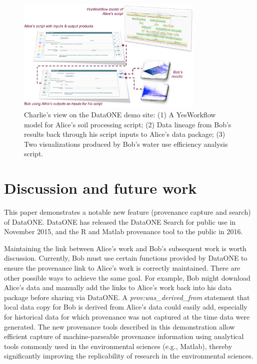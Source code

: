 \documentclass[a4paper]{llncs}
\begin{document}
\begin{figure}[t]
\centering   
\includegraphics[width=0.8\textwidth]{figs/abc-crop}
\caption{Charlie's view on the DataONE demo site: (1) A YesWorkflow model for Alice's soil processing script; (2) Data lineage from Bob's results back through his script inputs to Alice's data package; (3) Two visualizations produced by Bob's water use efficiency analysis script.}
\label{fig2}
\end{figure}


\section{Discussion and future work}

This paper demonstrates a notable new feature (provenance capture and search) of DataONE. DataONE has released the DataONE Search for public use in November 2015, and the R and Matlab provenance tool to the public in 2016. 

Maintaining the link between Alice's work and Bob's subsequent work is worth discussion. Currently, Bob must use certain functions provided by DataONE to ensure the provenance link to Alice's work is correctly maintained. There are other possible ways to achieve the same goal. For example,  Bob might download Alice's data and manually add the links to Alice's work back into his data package before sharing via DataONE. A \emph{prov:was\_derived\_from} statement that local data copy for Bob is derived from Alice's data could easily add, especially for historical data for which provenance was not captured at the time data were generated.  The new provenance tools described in this demonstration allow efficient capture of machine-parseable provenance information using analytical tools commonly used in the environmental sciences (e.g., Matlab), thereby significantly improving the replicability of research in the environmental sciences.
\end{document}
